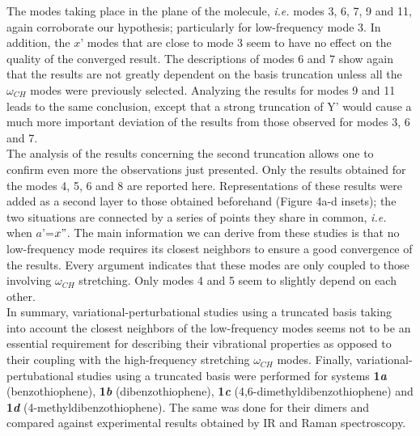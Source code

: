 	The modes taking place in the plane of the molecule, \textit{i.e.} modes 3, 6, 7, 9 and 11, again corroborate our hypothesis; particularly for low-frequency mode 3. In addition, the $x’$ modes that are close to mode 3 seem to have no effect on the quality of the converged result. The descriptions of modes 6 and 7 show again that the results are not greatly dependent on the basis truncation unless all the $\omega_{CH}$ modes were previously selected. Analyzing the results for modes 9 and 11 leads to the same conclusion, except that a strong truncation of Y’ would cause a much more important deviation of the results from those observed for modes 3, 6 and 7.\\
	
	The analysis of the results concerning the second truncation allows one to confirm even more the observations just presented. Only the results obtained for the modes 4, 5, 6 and 8 are reported here. Representations of these results were added as a second layer to those obtained beforehand (Figure 4a-d insets); the two situations are connected by a series of points they share in common, \textit{i.e.} when $a’$=$x"$. The main information we can derive from these studies is that no low-frequency mode requires its closest neighbors to ensure a good convergence of the results. Every argument indicates that these modes are only coupled to those involving $\omega_{CH}$ stretching. Only modes 4 and 5 seem to slightly depend on each other.\\
	
		In summary, variational-perturbational studies using a truncated basis taking into account the closest neighbors of the low-frequency modes seems not to be an essential requirement for describing their vibrational properties as opposed to their coupling with the high-frequency stretching $\omega_{CH}$ modes. Finally, variational-pertubational studies using a truncated basis were performed for systems \textbf{1\textit{a}} (benzothiophene), \textbf{1\textit{b}} (dibenzothiophene), \textbf{1\textit{c}} (4,6-dimethyldibenzothiophene) and \textbf{1\textit{d}} (4-methyldibenzothiophene). The same was done for their dimers and compared against experimental results obtained by IR and Raman spectroscopy.\\
	
